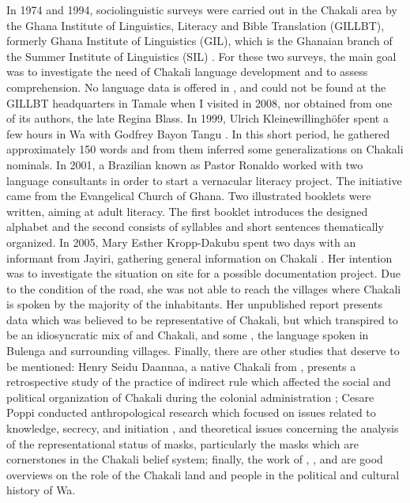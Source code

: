 \newpage 
In 
1974 and 1994, sociolinguistic surveys were carried out in the Chakali area by 
the Ghana Institute of Linguistics, Literacy and Bible Translation (GILLBT), 
formerly Ghana Institute of Linguistics (GIL), which is the Ghanaian branch of 
the Summer Institute of Linguistics (SIL) \citep{Reim75, Tomp02}. For these two 
surveys, the main goal  was to investigate the need of Chakali language 
development and to assess   comprehension. No language data is offered in 
  \citet{Tomp02}, and \citet{Reim75}  could not be found at the 
GILLBT headquarters in Tamale when I visited in 2008, nor obtained from one of its authors, the late 
Regina Blass.  In 1999, Ulrich Kleinewillinghöfer spent a few hours in Wa 
with Godfrey Bayon Tangu \citep{Klei99}. In this short period,  he  gathered 
approximately 150 words  and from them  inferred some generalizations on Chakali 
nominals. In 2001, a Brazilian  known as Pastor Ronaldo worked with two  
language consultants in order to start a vernacular literacy project. The 
initiative came from the Evangelical Church of Ghana.  Two illustrated booklets 
were written,  aiming at adult literacy.  The first 
booklet introduces the designed alphabet  and the second  
consists of  syllables and short sentences thematically organized. In 2005, 
 Mary Esther Kropp-Dakubu spent two  days with an informant from Jayiri, 
gathering general information on Chakali  \citep{Daku05}. Her intention was to 
investigate the situation on site for a possible documentation project. Due to 
the condition of the road, she was not able to reach the villages where Chakali is spoken by the majority of the inhabitants.  Her unpublished report  presents  data which was believed to be representative of  Chakali, but which transpired to be an idiosyncratic mix of  and Chakali, and some ,  the language spoken in Bulenga and surrounding villages. Finally, there are other studies that deserve to be mentioned:  Henry Seidu Daannaa,   a native Chakali from ,  presents a retrospective study of the practice of indirect rule  which affected the social and political organization of  Chakali during the colonial administration \citep{Daan94};    Cesare Poppi conducted anthropological research which focused on issues related to knowledge, secrecy,  and initiation \citep{Popp93}, and  theoretical issues concerning the analysis of the representational status of masks, particularly the {\it {}} masks which are cornerstones in the  Chakali belief system; finally, the work of \citet{Doug66},  \citet{Wilk89}, and \citet{Sali08}  are good  overviews on the role of the Chakali land and people in the  political and cultural history of Wa.

